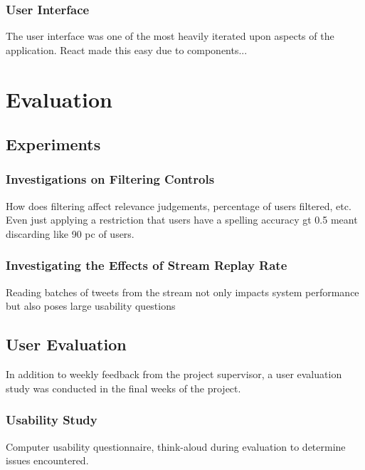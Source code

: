\documentclass{l4proj}
\begin{document}
        \subsection{User Interface}
        The user interface was one of the most heavily iterated upon aspects of the application. React made this easy due to components...
        

        
        
\chapter{Evaluation}

\section{Experiments}
    
    \subsection{Investigations on Filtering Controls}
    How does filtering affect relevance judgements, percentage of users filtered, etc. Even just applying a restriction that users have a spelling accuracy gt 0.5 meant discarding like 90 pc of users.
    
    \subsection{Investigating the Effects of Stream Replay Rate}
    Reading batches of tweets from the stream not only impacts system performance but also poses large usability questions

\section{User Evaluation}

    In addition to weekly feedback from the project supervisor, a user evaluation study was conducted in the final weeks of the project.

    \subsection{Usability Study}
    Computer usability questionnaire, think-aloud during evaluation to determine issues encountered.
    
\end{document}
